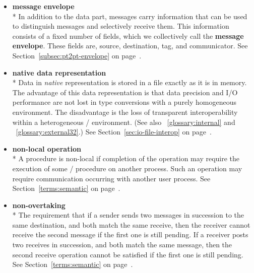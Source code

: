 \begin{itemize}
\label{glossary:message_envelope}
\item \textbf{ message envelope} \\*
In addition to the data part, messages carry information that can be used to
distinguish messages and selectively receive them.  This information consists
of a fixed number of fields, which we collectively call
the {\bf message envelope}.   These fields are, source, 
destination, tag, and communicator.
See Section~\ref{subsec:pt2pt-envelope} on page~\pageref{subsec:pt2pt-envelope}.

\label{glossary:native_data_representation}
\item \textbf{ native data representation} \\*
Data in \emph{native} representation is stored in a file exactly
as it is in memory.
The advantage of this data representation is that
data precision and I/O performance are not lost in type conversions
with a purely homogeneous environment.
The disadvantage is the loss of transparent interoperability within a
heterogeneous \MPI/ environment.
(See also ~\ref{glossary:internal} and ~\ref{glossary:external32}.)
See Section~\ref{sec:io-file-interop} on page~\pageref{sec:io-file-interop}.

\label{glossary:non-local_operation}
\item \textbf{ non-local operation} \\*
A procedure is non-local if completion of the operation may require
the execution of some \MPI/ procedure on another process.  Such an
operation may require
communication occurring with another user process.
See Section~\ref{terms:semantic} on page~\pageref{terms:semantic}.

\label{glossary:non-overtaking}
\item \textbf{ non-overtaking} \\* 
The requirement that
if a sender sends two messages in succession to the same destination, and
both match the same receive, then the receiver cannot receive the
second message if the first one is still pending.
If a receiver posts two receives in succession, and both match the same
message,
then the second receive operation cannot be satisfied if the
first one is still pending.
See Section~\ref{terms:semantic} on page~\pageref{terms:semantic}.


\end{itemize}
